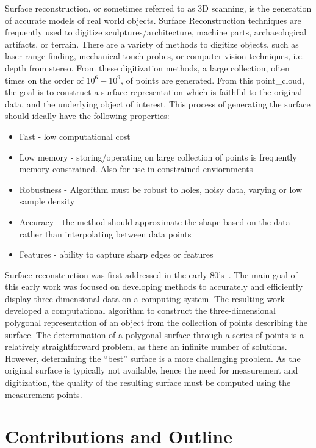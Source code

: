 Surface reconstruction, or sometimes referred to as 3D scanning, is the generation of accurate models of real world objects.
Surface Reconstruction techniques are frequently used to digitize sculptures/architecture, machine parts, archaeological artifacts, or terrain.
There are a variety of methods to digitize objects, such as laser range finding, mechanical touch probes, or computer vision techniques, i.e. depth from stereo.
From these digitization methods, a large collection, often times on the order of \( 10^6 - 10^9\), of points are generated.
From this \gls{point_cloud}, the goal is to construct a surface representation which is faithful to the original data, and the underlying object of interest.
This process of generating the surface should ideally have the following properties:
\begin{itemize}
    \item Fast - low computational cost
    \item Low memory - storing/operating on large collection of points is frequently memory constrained. Also for use in constrained enviornments
    \item Robustness - Algorithm must be robust to holes, noisy data, varying or low sample density
    \item Accuracy - the method should approximate the shape based on the data rather than interpolating between data points
    \item Features - ability to capture sharp edges or features
\end{itemize}

Surface reconstruction was first addressed in the early 80's~\cite{uselton1983,uselton1981}.
The main goal of this early work was focused on developing methods to accurately and efficiently display three dimensional data on a computing system.
The resulting work developed a computational algorithm to construct the three-dimensional polygonal representation of an object from the collection of points describing the surface.
The determination of a polygonal surface through a series of points is a relatively straightforward problem, as there an infinite number of solutions.
However, determining the ``best'' surface is a more challenging problem.
As the original surface is typically not available, hence the need for measurement and digitization, the quality of the resulting surface must be computed using the measurement points.

\section{Contributions and Outline}

